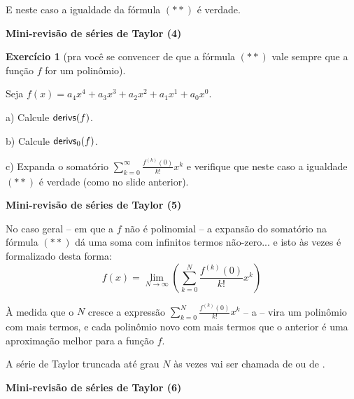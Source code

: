 \documentclass[oneside,12pt]{article}
\begin{document}
E neste caso a igualdade da fórmula $(**)$ é verdade.

\newpage


{\bf Mini-revisão de séries de Taylor (4)}

\ssk

{\bf Exercício 1} (pra você se convencer de que a fórmula $(**)$ vale
sempre que a função $f$ for um polinômio).

Seja $f(x) = a_4x^4 + a_3x^3 + a_2x^2 + a_1x^1 + a_0x^0$.

\ssk

a) Calcule $\mathsf{derivs}(f)$.

b) Calcule $\mathsf{derivs}_0(f)$. 

c) Expanda o somatório $\sum_{k=0}^∞ \frac{f^{(k)}(0)}{k!} x^k$ e
verifique que neste caso a igualdade $(**)$ é verdade (como no slide
anterior).



\newpage


{\bf Mini-revisão de séries de Taylor (5)}

\ssk

No caso geral -- em que a $f$ não é polinomial -- a expansão do
somatório na fórmula $(**)$ dá uma soma com infinitos termos
não-zero... e isto às vezes é formalizado desta forma:
%
$$f(x) = \displaystyle \lim_{N→∞} \left(\sum_{k=0}^N \frac{f^{(k)}(0)}{k!} x^k\right)$$

À medida que o $N$ cresce a expressão $\sum_{k=0}^N
\frac{f^{(k)}(0)}{k!} x^k$ -- a  -- vira um polinômio com mais termos, e
cada polinômio novo com mais termos que o anterior é uma aproximação
melhor para a função $f$.

\msk

A série de Taylor truncada até grau $N$ às vezes vai ser chamada de
 ou de .



\newpage


{\bf Mini-revisão de séries de Taylor (6)}

\ssk
\end{document}
